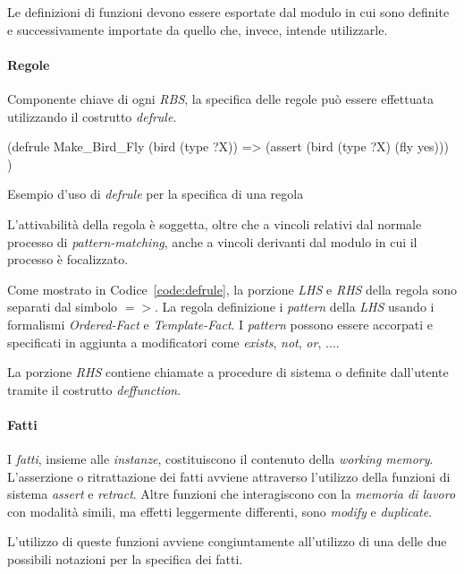 Le definizioni di funzioni devono essere esportate dal modulo in cui sono definite e successivamente importate da quello che, invece, intende utilizzarle.

\paragraph{Regole}
Componente chiave di ogni \emph{RBS}, la specifica delle regole può essere effettuata utilizzando il costrutto \emph{defrule}.

\begin{program}
\begin{verbatimtab}

(defrule Make_Bird_Fly
	(bird (type ?X))
	=>
	(assert (bird (type ?X)	(fly yes)))
)
\end{verbatimtab}
\caption{Esempio d'uso di \emph{defrule} per la specifica di una regola}\label{code:defrule}
\end{program}

L'attivabilità della regola è soggetta, oltre che a vincoli relativi dal normale processo di \emph{pattern-matching}, anche a vincoli derivanti dal modulo in cui il processo è focalizzato.

Come mostrato in Codice~\ref{code:defrule}, la porzione \emph{LHS} e \emph{RHS} della regola sono separati dal simbolo $=>$. La regola definizione i \emph{pattern} della \emph{LHS} usando i formalismi \emph{Ordered-Fact} e \emph{Template-Fact}. I \emph{pattern} possono essere accorpati e specificati in aggiunta a modificatori come \emph{exists}, \emph{not}, \emph{or}, $\dots$.

La porzione \emph{RHS} contiene chiamate a procedure di sistema o definite dall'utente tramite il costrutto \emph{deffunction}.

\paragraph{Fatti}

I \emph{fatti}, insieme alle \emph{instanze}, costituiscono il contenuto della \emph{working memory}. L'asserzione o ritrattazione dei fatti avviene attraverso l'utilizzo della funzioni di sistema \emph{assert} e \emph{retract}. Altre funzioni che interagiscono con la \emph{memoria di lavoro} con modalità simili, ma effetti leggermente differenti, sono \emph{modify} e \emph{duplicate}.

L'utilizzo di queste funzioni avviene congiuntamente all'utilizzo di una delle due possibili notazioni per la specifica dei fatti.

